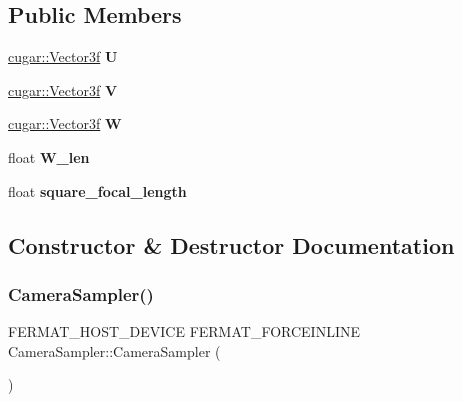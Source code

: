 \subsection*{Public Members}
\begin{DoxyCompactItemize}
\item 
\mbox{\label{struct_camera_sampler_a78eb2537995dd7909bdeeb1dbd83bbfe}} 
\hyperlink{structcugar_1_1_vector}{cugar\+::\+Vector3f} {\bfseries U}
\item 
\mbox{\label{struct_camera_sampler_a6701783b3acedd9d54c22ee4decb3fb5}} 
\hyperlink{structcugar_1_1_vector}{cugar\+::\+Vector3f} {\bfseries V}
\item 
\mbox{\label{struct_camera_sampler_a4647d9cea99da93ffb22bda37cd0cef0}} 
\hyperlink{structcugar_1_1_vector}{cugar\+::\+Vector3f} {\bfseries W}
\item 
\mbox{\label{struct_camera_sampler_a74381044c3ffd87d1b88890abb39c084}} 
float {\bfseries W\+\_\+len}
\item 
\mbox{\label{struct_camera_sampler_abd374561d2f1ea3cd0bdbd4839f8cfc7}} 
float {\bfseries square\+\_\+focal\+\_\+length}
\end{DoxyCompactItemize}


\subsection{Constructor \& Destructor Documentation}
\mbox{\label{struct_camera_sampler_a50332d884a007ab1ffcb05215af5d92a}} 
\subsubsection{\texorpdfstring{Camera\+Sampler()}{CameraSampler()}\hspace{0.1cm}{\footnotesize\ttfamily [1/2]}}
{\footnotesize\ttfamily F\+E\+R\+M\+A\+T\+\_\+\+H\+O\+S\+T\+\_\+\+D\+E\+V\+I\+CE F\+E\+R\+M\+A\+T\+\_\+\+F\+O\+R\+C\+E\+I\+N\+L\+I\+NE Camera\+Sampler\+::\+Camera\+Sampler (\begin{DoxyParamCaption}{ }\end{DoxyParamCaption})\hspace{0.3cm}{\ttfamily [inline]}}


